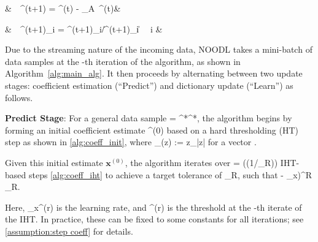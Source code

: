 \documentclass{article}
\newcommand{\HT}{{\c{T}}}
\def\[#1\]{{$#1$}}
\def\b#1{{\mathbf{#1}}}
\def\c#1{{\mathcal{#1}}}
\begin{document}
\begin{algorithm}[h]
{\begin{flalign}\label{eq:apx_grad}
&\hspace{0.14in}~~\b{A}^{(t+1)} = \b{A}^{(t)} - \eta_A~\hat{\b{g}}^{(t)}&
\end{flalign}\vspace{-20pt}

\begin{flalign*}
&\hspace{0.14in}~~\b{A}^{(t+1)}_i = \b{A}^{(t+1)}_i/\|\b{A}^{(t+1)}_i\| ~\forall~i \in [m]&
\end{flalign*}\vspace{-18pt}

}
\end{algorithm}




Due to the streaming nature of the incoming data, NOODL takes a mini-batch of \[p\] data samples at the \[t\]-th iteration of the algorithm, as shown in Algorithm~\ref{alg:main_alg}. It then proceeds by alternating between two update stages: coefficient estimation (``Predict'') and dictionary update (``Learn'') as follows. 


















\noindent\textbf{Predict Stage}: 
For a general data sample \[\b{y} = \b{A}^*\b{x}^*\], the algorithm begins by forming an initial coefficient estimate \[\b{x}^{(0)}\] based on a hard thresholding (HT) step as shown in \eqref{alg:coeff_init}, where \[\HT_{\tau}(z) := z\cdot{}_{|z|\geq \tau}\] for a vector \[\b{z}\].





Given this initial estimate $\b{x}^{(0)}$, the algorithm iterates over  \[R= \Omega(\log(1/\delta_{R}))\] IHT-based steps \eqref{alg:coeff_iht} to achieve a target tolerance of \[\delta_{R}\], such that \[(1 - \eta_{x})^{R} \leq \delta_{R}\]. 



Here, \[\eta_{x}^{(r)}\] is the learning rate, and \[\tau^{(r)}\] is the threshold at the \[r\]-th iterate of the IHT. In practice, these can be fixed to some constants for all iterations; see \ref{assumption:step coeff} for details. 
\end{document}
